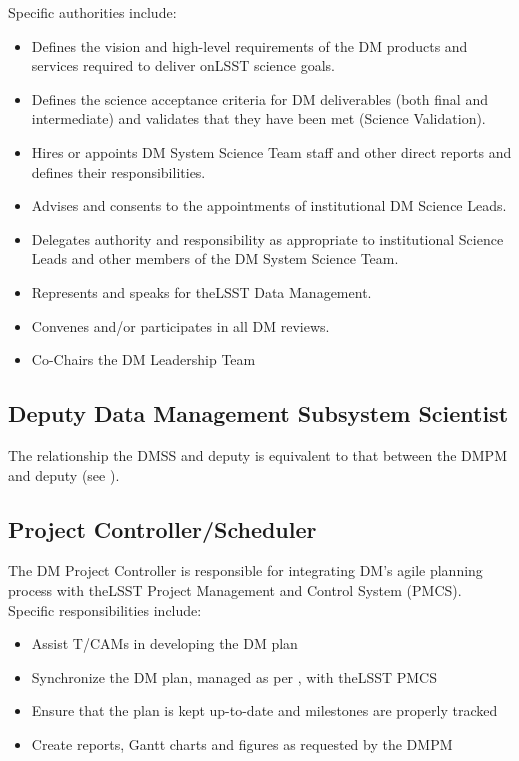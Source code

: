 Specific authorities include:

\begin{itemize}
\item Defines the vision and high-level requirements of the DM products and services required to deliver onLSST science goals.
\item Defines the science acceptance criteria for DM deliverables (both final and intermediate) and validates that they have been met (Science \gls{Validation}).
\item Hires or appoints DM System Science Team staff and other direct reports and defines their responsibilities.
\item Advises and consents to the appointments of institutional DM Science Leads.
\item Delegates authority and responsibility as appropriate to institutional Science Leads and other members of the DM System Science Team.
\item Represents and speaks for theLSST Data Management.
\item Convenes and/or participates in all DM reviews.
\item Co-Chairs the DM Leadership Team
\end{itemize}

\subsection{Deputy Data Management Subsystem Scientist}\label{role:ddmss}

The relationship the \gls{DMSS} and deputy is equivalent to that between the \gls{DMPM} and deputy (see ).


\subsection{Project Controller/Scheduler \label{role:pcon}}

The DM Project Controller is responsible for integrating DM's agile planning process with theLSST Project Management and Control System (\gls{PMCS}). Specific responsibilities include:

\begin{itemize}

  \item{Assist T/CAMs in developing the DM plan}
  \item{Synchronize the DM plan, managed as per , with theLSST PMCS}
  \item{Ensure that the plan is kept up-to-date and milestones are properly tracked}
  \item{Create reports, Gantt charts and figures as requested by the \gls{DMPM}}

\end{itemize}

